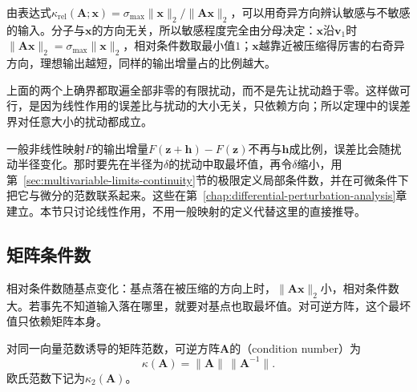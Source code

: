由表达式$\kappa_{\mathrm{rel}}(\bm A;\bm x)=\sigma_{\max}\lVert\bm x\rVert_2/\lVert\bm A\bm x\rVert_2$，可以用奇异方向辨认敏感与不敏感的输入。分子与$\bm x$的方向无关，所以敏感程度完全由分母决定：$\bm x$沿$\bm v_1$时$\lVert\bm A\bm x\rVert_2=\sigma_{\max}\lVert\bm x\rVert_2$，相对条件数取最小值$1$；$\bm x$越靠近被压缩得厉害的右奇异方向，理想输出越短，同样的输出增量占的比例越大。

上面的两个上确界都取遍全部非零的有限扰动，而不是先让扰动趋于零。这样做可行，是因为线性作用的误差比与扰动的大小无关，只依赖方向；所以定理中的误差界对任意大小的扰动都成立。

一般非线性映射$F$的输出增量$F(\bm z+\bm h)-F(\bm z)$不再与$\bm h$成比例，误差比会随扰动半径变化。那时要先在半径为$\delta$的扰动中取最坏值，再令$\delta$缩小，用第~\ref{sec:multivariable-limits-continuity}节的极限定义局部条件数，并在可微条件下把它与微分的范数联系起来。这些在第~\ref{chap:differential-perturbation-analysis}章建立。本节只讨论线性作用，不用一般映射的定义代替这里的直接推导。

\subsection{矩阵条件数}
\label{sec:ls-matrix-condition-number}

相对条件数随基点变化：基点落在被压缩的方向上时，$\lVert\bm A\bm x\rVert_2$小，相对条件数大。若事先不知道输入落在哪里，就要对基点也取最坏值。对可逆方阵，这个最坏值只依赖矩阵本身。

\begin{definition}[可逆矩阵的条件数]
\label{def:matrix-analysis-condition-number}
对同一向量范数诱导的矩阵范数，可逆方阵$\bm A$的（condition number）为
\begin{equation}
 \kappa(\bm A)=\lVert\bm A\rVert\,\lVert\bm A^{-1}\rVert .
 \label{eq:matrix-analysis-condition-number}
\end{equation}
欧氏范数下记为$\kappa_2(\bm A)$。
\end{definition}

